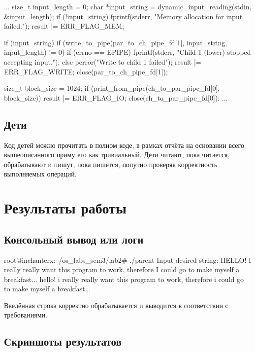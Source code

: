 \documentclass[a4paper,12pt]{article}
\begin{document}
\begin{codeblock}
...
size_t input_length = 0;
char *input_string = dynamic_input_reading(stdin, &input_length);
if (!input_string) {
    fprintf(stderr, "Memory allocation for input failed.\n");
    result |= ERR_FLAG_MEM;
}

if (input_string) {
    if (write_to_pipe(par_to_ch_pipe_fd[1], input_string, input_length) != 0) {
        if (errno == EPIPE) {
            fprintf(stderr, "Child 1 (lower) stopped accepting input.\n");
        } else {
            perror("Write to child 1 failed");
        }
        result |= ERR_FLAG_WRITE;
    }
}
close(par_to_ch_pipe_fd[1]);

size_t block_size = 1024;
if (print_from_pipe(ch_to_par_pipe_fd[0], block_size)) {
    result |= ERR_FLAG_IO;
}
close(ch_to_par_pipe_fd[0]);
...
\end{codeblock}

\subsection{Дети}

Код детей можно прочитать в полном коде, в рамках отчёта на основании всего вышеописанного приму его как тривиальный. Дети читают, пока читается, обрабатывают и пишут, пока пишется, попутно проверяя корректность выполняемых операций.

\section{Результаты работы}

\subsection{Консольный вывод или логи}

\begin{codeblock}
root@inchanterx:~/os_labs_sem3/lab2# ./parent
Input desired string: HELLO! I really  really    want this program to work, therefore I could go to make myself a breakfast...
hello! i really really want this program to work, therefore i could go to make myself a breakfast...
\end{codeblock}

Введённая строка корректно обрабатывается и выводится в соответствии с требованиями.

\subsection{Скриншоты результатов}
\end{document}
